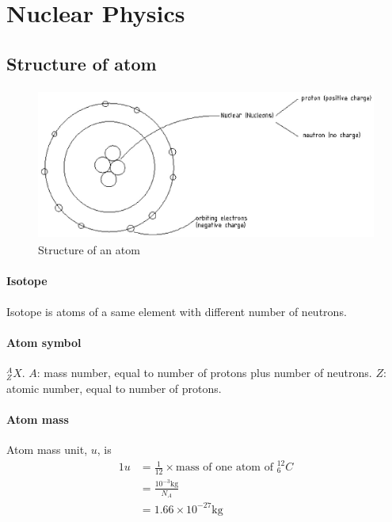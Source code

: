 \section{Nuclear Physics}
    \subsection{Structure of atom}
        \begin{figure}[H]
            \begin{center}
                \includegraphics[height=5cm]{nuclear_charts/nuc_struct.eps}
            \end{center}
            \caption{Structure of an atom}
            \label{atom_struct}
        \end{figure}
        
        \paragraph{Isotope}
            Isotope is atoms of a same element with different number of neutrons.
        
        \paragraph{Atom symbol}
            $_Z^A X$. $A$: mass number, equal to number of protons plus number of neutrons. $Z$: atomic number, equal to number of protons.

        \paragraph{Atom mass}
            Atom mass unit, $u$, is
            \begin{align}
                1 u &= \frac{1}{12} \times \mbox{mass\ of\ one\ atom\ of\ } _6^{12} C \\
                    &= \frac{10^{-3} \mathrm{kg}}{N_A} \\
                    &= 1.66 \times 10^{-27} \mathrm{kg}
            \end{align}

